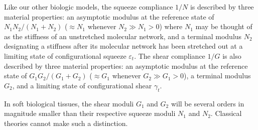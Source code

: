 Like our other biologic models, the squeeze compliance $1/N$ is described by three material properties: an asymptotic modulus at the reference state of $N_1 N_2 / (N_1 + N_2)$ ($\approx N_1$ whenever $N_2 \gg N_1 > 0$) where $N_1$ may be thought of as the stiffness of an unstretched molecular network, and a terminal modulus $N_2$ designating a stiffness after its molecular network has been stretched out at a limiting state of configurational squeeze $\varepsilon_t$.  The shear compliance $1/G$ is also described by three material properties: an asymptotic modulus at the reference state of $G_1 G_2 / ( G_1 + G_2 )$ ($\approx G_1$ whenever $G_2 \gg G_1 > 0$), a terminal modulus $G_2$, and a limiting state of configurational shear $\gamma_t$.  

In soft biological tissues, the shear moduli $G_1$ and $G_2$ will be several orders in magnitude smaller than their respective squeeze moduli $N_1$ and $N_2$.  Classical theories cannot make such a distinction.
